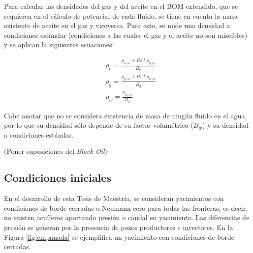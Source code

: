Para calcular las densidades del gas y del aceite en el BOM extendido, que se requieren en el cálculo de potencial de cada fluido, se tiene en cuenta la masa existente de aceite en el gas y viceversa. Para esto, se mide una densidad a condiciones estándar (condiciones a las cuales el gas y el aceite no son miscibles) y se aplican la siguientes ecuaciones:

\begin{align}
	\label{ec:oildensity}&\rho_{o} = \frac{\rho_{o,sc} + Rs*\rho_{g,sc}}{B_{o}}\\
	\label{ec:gasdensity}&\rho_{g} = \frac{\rho_{g,sc} + Rv*\rho_{o,sc}}{B_{g}}\\
	\label{ec:watdensity}&\rho_{w} = \frac{\rho_{w,sc}}{B_{w}}
\end{align}

Cabe anotar que no se considera existencia de masa de ningún fluido en el agua, por lo que su densidad sólo depende de su factor volumétrico ($B_{w}$) y su densidad a condiciones estándar.





(Poner suposiciones del \textit{Black Oil})



\subsection{Condiciones iniciales}

En el desarrollo de esta Tesis de Maestría, se consideran yacimientos con condiciones de borde cerradas o Neumann cero para todas las fronteras, es decir, no existen acuíferos aportando presión o caudal en yacimiento. Las diferencias de presión se generan por la presencia de pozos productores e inyectores. En la Figura \ref{fig:empanada} se ejemplifica un yacimiento con condiciones de borde cerradas.\\

